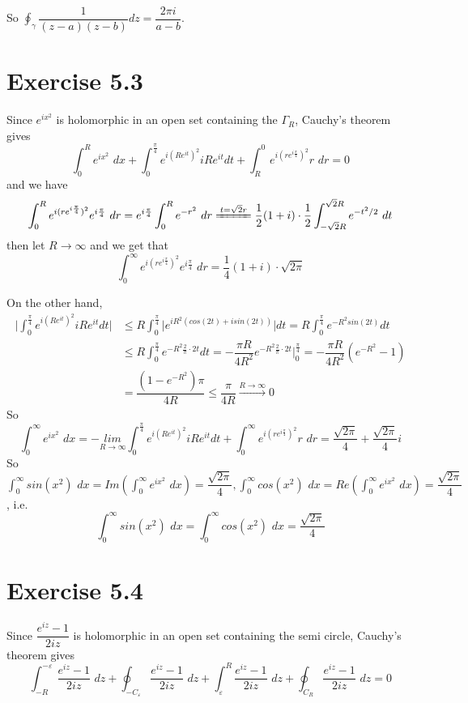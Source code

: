 \documentclass[a4paper,12pt,titlepage]{article}
\begin{document}
So $\oint_{\gamma}\dfrac{1}{(z-a)(z-b)}dz=\dfrac{2\pi i}{a-b}$.

\section*{Exercise 5.3}
Since $e^{ix^2}$ is holomorphic in an open set containing the $\Gamma _R$, Cauchy's theorem gives
$$\int_0^Re^{ix^2}\,\,dx+\int_0^{\frac{\pi}{4}}e^{i(Re^{it})^2}iRe^{it}dt+\int^0_Re^{i(re^{i\frac{\pi}{4}})^2}r\,\,dr=0$$
and we have
$$\int_0^Re^{i(re^{i\frac{\pi}{4}})^2}e^{i\frac{\pi}{4}}\,\,dr=e^{i\frac{\pi}{4}}\int_0^Re^{-r^2}\,\,dr\xlongequal{t=\sqrt{2}r}\dfrac{1}{2}(1+i)\cdot\dfrac{1}{2}\int_{-\sqrt{2}R}^{\sqrt{2}R}e^{-t^2/2}\,\,dt$$
then let $R\rightarrow\infty$ and we get that
$$\int_0^{\infty}e^{i(re^{i\frac{\pi}{4}})^2}e^{i\frac{\pi}{4}}\,\,dr=\dfrac{1}{4}(1+i)\cdot\sqrt{2\pi}$$

On the other hand, 
\begin{align*}
\Big|\int_0^{\frac{\pi}{4}}e^{i(Re^{it})^2}iRe^{it}dt\Big|&\leqslant R\int_0^{\frac{\pi}{4}}\Big|e^{iR^2(cos(2t)+isin(2t))}\Big|dt=R\int_0^{\frac{\pi}{4}}e^{-R^2sin(2t)}dt\\
&\leqslant R\int_0^{\frac{\pi}{4}}e^{-R^2\frac{2}{\pi}\cdot2t}dt=-\dfrac{\pi R}{4R^2}e^{-R^2\frac{2}{\pi}\cdot2t}\Big|_0^{\frac{\pi}{4}}=-\dfrac{\pi R}{4R^2}(e^{-R^2}-1)\\
&=\dfrac{(1-e^{-R^2})\pi}{4R}\leqslant\dfrac{\pi}{4R}\overset{R\rightarrow\infty}{\longrightarrow}0
\end{align*}
So $$\int_0^{\infty}e^{ix^2}\,\,dx=-\underset{R\rightarrow \infty}{lim}\int_0^{\frac{\pi}{4}}e^{i(Re^{it})^2}iRe^{it}dt+\int_0^{\infty}e^{i(re^{i\frac{\pi}{4}})^2}r\,\,dr=\dfrac{\sqrt{2\pi}}{4}+\dfrac{\sqrt{2\pi}}{4}i$$
So $\int_0^{\infty}sin(x^2)\,\,dx=Im(\int_0^{\infty}e^{ix^2}\,\,dx)=\dfrac{\sqrt{2\pi}}{4},\int_0^{\infty}cos(x^2)\,\,dx=Re(\int_0^{\infty}e^{ix^2}\,\,dx)=\dfrac{\sqrt{2\pi}}{4}$, i.e.
$$\int_0^{\infty}sin(x^2)\,\,dx=\int_0^{\infty}cos(x^2)\,\,dx=\dfrac{\sqrt{2\pi}}{4}$$

\section*{Exercise 5.4}

Since $\dfrac{e^{iz}-1}{2iz}$ is holomorphic in an open set containing the semi circle, Cauchy's theorem gives
$$\int_{-R}^{-\varepsilon}\dfrac{e^{iz}-1}{2iz}\,\,dz+\oint_{-C_{\varepsilon}}\dfrac{e^{iz}-1}{2iz}\,\,dz+\int^{R}_{\varepsilon}\dfrac{e^{iz}-1}{2iz}\,\,dz+\oint_{C_{R}}\dfrac{e^{iz}-1}{2iz}\,\,dz=0$$
\end{document}
